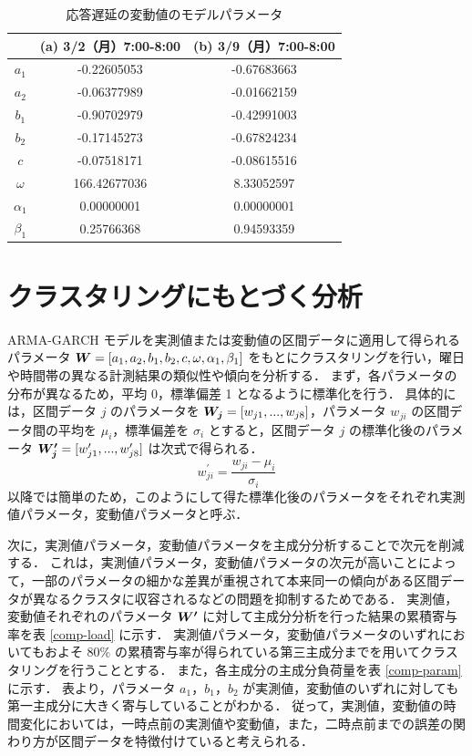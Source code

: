\documentclass[technicalreport]{ieicej}
\begin{document}
\begin{table}[tb]
\centering
\caption{応答遅延の変動値のモデルパラメータ}
\label{diff-param}
\begin{tabular}{|c|c|c|}
\hline
&(a) 3/2（月）7:00-8:00&(b) 3/9（月）7:00-8:00\\
\hline
$a_1$&-0.22605053&-0.67683663\\
\hline
$a_2$&-0.06377989&-0.01662159\\
\hline
$b_1$&-0.90702979&-0.42991003\\
\hline
$b_2$&-0.17145273&-0.67824234\\
\hline
$c$&-0.07518171&-0.08615516\\
\hline
$\omega$&166.42677036&8.33052597\\
\hline
$\alpha_1$&0.00000001&0.00000001\\
\hline
$\beta_1$&0.25766368&0.94593359\\
\hline
\end{tabular}
\end{table}

\section{クラスタリングにもとづく分析}
 ARMA-GARCH モデルを実測値または変動値の区間データに適用して得られるパラメータ $\mbox{\boldmath $W$} = [a_1, a_2, b_1, b_2, c, \omega, \alpha_1, \beta_1]$ をもとにクラスタリングを行い，曜日や時間帯の異なる計測結果の類似性や傾向を分析する．
 まず，各パラメータの分布が異なるため，平均 0，標準偏差 1 となるように標準化を行う．
具体的には，区間データ $j$ のパラメータを $\mbox{\boldmath $W_j$} = [w_{j1},...,w_{j8}]$，パラメータ $w_{ji}$ の区間データ間の平均を $\mu_i$，標準偏差を $\sigma_i$ とすると，区間データ $j$ の標準化後のパラメータ $\mbox{\boldmath $W_j^\prime$} = [w_{j1}^\prime,...,w_{j8}^\prime]$ は次式で得られる．
$$w_{ji}^\prime = \frac{w_{ji} - \mu_i}{\sigma_i}$$
以降では簡単のため，このようにして得た標準化後のパラメータをそれぞれ実測値パラメータ，変動値パラメータと呼ぶ． 

次に，実測値パラメータ，変動値パラメータを主成分分析\cite{jolliffe2016principal}することで次元を削減する．
これは，実測値パラメータ，変動値パラメータの次元が高いことによって，一部のパラメータの細かな差異が重視されて本来同一の傾向がある区間データが異なるクラスタに収容されるなどの問題を抑制するためである．
実測値，変動値それぞれのパラメータ $\mbox{\boldmath $W^\prime$}$ に対して主成分分析を行った結果の累積寄与率を表 \ref{comp-load} に示す．
実測値パラメータ，変動値パラメータのいずれにおいてもおよそ $80\%$ の累積寄与率が得られている第三主成分までを用いてクラスタリングを行うこととする．
また，各主成分の主成分負荷量を表 \ref{comp-param} に示す．
表より，パラメータ $a_1，b_1，b_2$ が実測値，変動値のいずれに対しても第一主成分に大きく寄与していることがわかる．
従って，実測値，変動値の時間変化においては，一時点前の実測値や変動値，また，二時点前までの誤差の関わり方が区間データを特徴付けていると考えられる．
\end{document}
